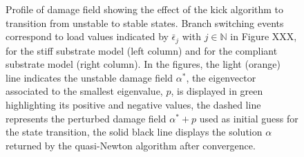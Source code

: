 \begin{figure}[htbp]
    \caption{
        Profile of damage field showing the effect of the kick algorithm to transition from unstable to stable states. Branch switching events correspond to load values indicated by $\bar \epsilon_j$ with $j\in \mathbb N$ in Figure XXX, for the stiff substrate model (left column) and for the compliant substrate model (right column). %
        In the figures, the light (orange) line indicates the unstable damage field $\alpha^*$, the eigenvector associated to the smallest eigenvalue, $p$, is displayed in green highlighting its positive and negative values, the dashed line represents the perturbed damage field  $\alpha^*+p$ used as initial guess for the state transition, the solid black line displays the solution $\alpha$ returned by the quasi-Newton algorithm after convergence.}
    \label{fig:}
\end{figure}



    



